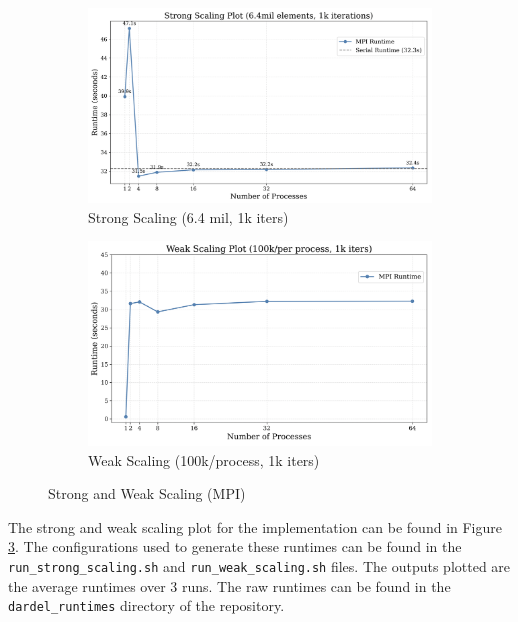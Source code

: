 \documentclass[a4paper,10pt]{article}
\begin{document}
\begin{figure}
     \centering
     \begin{subfigure}[b]{0.45\textwidth}
         \centering
         \includegraphics[width=\textwidth]{../images/3_mpi/strong_scaling.png}
         \caption{Strong Scaling (6.4 mil, 1k iters)}
         \label{fig:3_mpi_strong_scaling}
     \end{subfigure}
     \hfill
     \begin{subfigure}[b]{0.45\textwidth}
         \centering
         \includegraphics[width=\textwidth]{../images/3_mpi/weak_scaling.png}
         \caption{Weak Scaling (100k/process, 1k iters)}
         \label{fig:3_mpi_weak_scaling}
     \end{subfigure}
     \caption{Strong and Weak Scaling (MPI) }
     \label{fig:3_mpi_strong_weak}
\end{figure}

The strong and weak scaling plot for the implementation can be found in Figure \ref{fig:3_mpi_strong_weak}. The configurations used to generate these runtimes can be found in the \verb|run_strong_scaling.sh| and \verb|run_weak_scaling.sh| files. The outputs plotted are the average runtimes over 3 runs. The raw runtimes can be found in the \verb|dardel_runtimes| directory of the repository. 
\end{document}
